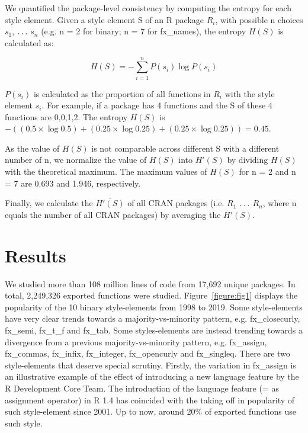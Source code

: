 We quantified the package-level consistency by computing the entropy for each style element. Given a style element S of an R package $R_{i}$, with possible n choices $s_{1}$, $\mathellipsis$ $s_{n}$ (e.g. n = 2 for binary; n = 7 for fx\_names), the entropy $H(S)$ is calculated as:

\begin{equation} \label{eqn}
H(S) = - \sum_{i = 1}^{n} P(s_{i}) \log P(s_{i})
\end{equation}

$P(s_{i})$ is calculated as the proportion of all functions in $R_{i}$ with the style element $s_{i}$. For example, if a package has 4 functions and the S of these 4 functions are {0,0,1,2}. The entropy $H(S)$ is $- ((0.5 \times \log 0.5) + (0.25 \times \log 0.25 ) + (0.25 \times \log 0.25)) = 0.45$.

As the value of $H(S)$ is not comparable across different S with a different number of n, we normalize the value of $H(S)$ into $H'(S)$ by dividing $H(S)$ with the theoretical maximum. The maximum values of $H(S)$ for n = 2 and n = 7 are 0.693 and 1.946, respectively.

Finally, we calculate the $\overline{H'(S)}$ of all CRAN packages (i.e. $R_{1}$ $\mathellipsis$ $R_{n}$, where n equals the number of all CRAN packages) by averaging the $H'(S)$.

\section{Results}

We studied more than 108 million lines of code from 17,692 unique packages. In total, 2,249,326 exported functions were studied. Figure~\ref{figure:fig1} displays the popularity of the 10 binary style-elements from 1998 to 2019. Some style-elements have very clear trends towards a majority-vs-minority pattern, e.g. fx\_closecurly, fx\_semi, fx\_t\_f and fx\_tab. Some styles-elements are instead trending towards a divergence from a previous majority-vs-minority pattern, e.g. fx\_assign, fx\_commas, fx\_infix, fx\_integer, fx\_opencurly and fx\_singleq. There are two style-elements that deserve special scrutiny. Firstly, the variation in fx\_assign is an illustrative example of the effect of introducing a new language feature by the R Development Core Team. The introduction of the language feature (= as assignment operator) in R 1.4 \citep{chambers} has coincided with the taking off in popularity of such style-element since 2001. Up to now, around 20\% of exported functions use such style.

